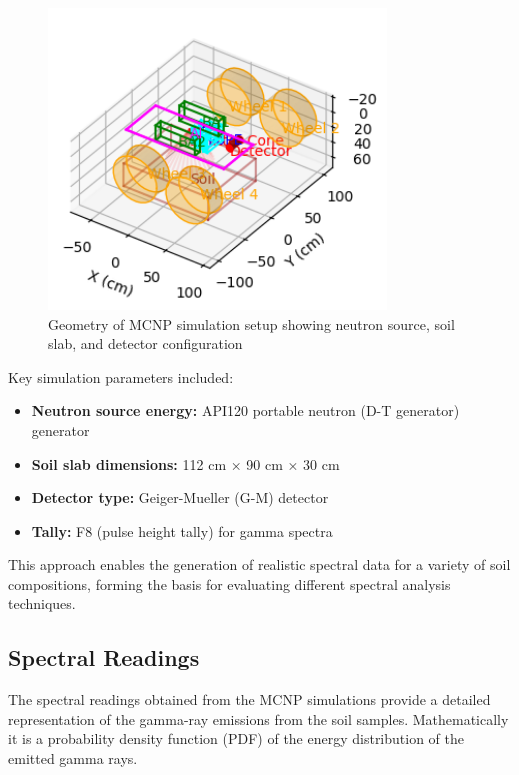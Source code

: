 \documentclass[review]{elsarticle}
\begin{document}
\begin{figure}[H]
\centering
\includegraphics[width=0.8\textwidth]{../Figures/DataGeneration/MCNPGeometry.png}
\caption{Geometry of MCNP simulation setup showing neutron source, soil slab, and detector configuration}
\label{fig:mcnp_geometry}
\end{figure}

Key simulation parameters included:
\begin{itemize}
\item \textbf{Neutron source energy:} API120 portable neutron (D-T generator) generator \cite{kavetskiy_energy_2018}
\item \textbf{Soil slab dimensions:} 112 cm × 90 cm × 30 cm
\item \textbf{Detector type:} Geiger-Mueller (G-M) detector \cite{yakubova_measuring_2025}
\item \textbf{Tally:} F8 (pulse height tally) for gamma spectra
\end{itemize}

This approach enables the generation of realistic spectral data for a variety of soil compositions, forming the basis for evaluating different spectral analysis techniques.

\subsection{Spectral Readings}

The spectral readings obtained from the MCNP simulations provide a detailed representation of the gamma-ray emissions from the soil samples. Mathematically it is a probability density function (PDF) of the energy distribution of the emitted gamma rays.
\end{document}
